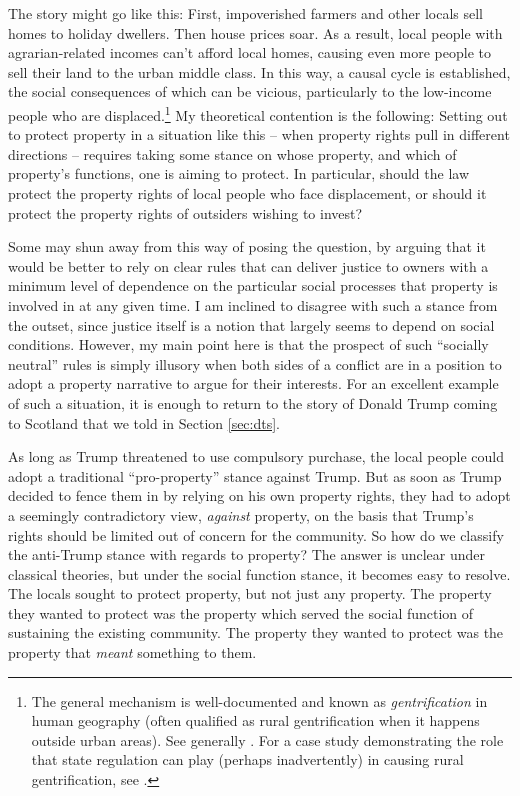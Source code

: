 \documentclass[12pt,a4paper]{book} %
\begin{document}
The story might go like this: First, impoverished farmers and other locals sell homes to holiday dwellers. Then house prices soar. As a result, local people with agrarian-related incomes can't afford local homes, causing even more people to sell their land to the urban middle class. In this way, a causal cycle is established, the social consequences of which can be vicious, particularly to the low-income people who are displaced.\footnote{The general mechanism is well-documented and known as {\it gentrification} in human geography (often qualified as rural gentrification when it happens outside urban areas). See generally \cite{weesep94,phillips93,slater06}. For a case study demonstrating the role that state regulation can play (perhaps inadvertently) in causing rural gentrification, see \cite[1027-1030]{darling05}.} My theoretical contention is the following: Setting out to protect property in a situation like this -- when property rights pull in different directions -- requires taking some stance on whose property, and which of property's functions, one is aiming to protect. In particular, should the law protect the property rights of local people who face displacement, or should it protect the property rights of outsiders wishing to invest?

Some may shun away from this way of posing the question, by arguing that it would be better to rely on clear rules that can deliver justice to owners with a minimum level of dependence on the particular social processes that property is involved in at any given time. I am inclined to disagree with such a stance from the outset, since justice itself is a notion that largely seems to depend on social conditions. However, my main point here is that the prospect of such ``socially neutral'' rules is simply illusory when both sides of a conflict are in a position to adopt a property narrative to argue for their interests. For an excellent example of such a situation, it is enough to return to the story of Donald Trump coming to Scotland that we told in Section \ref{sec:dts}.

As long as Trump threatened to use compulsory purchase, the local people could adopt a traditional ``pro-property'' stance against Trump. But as soon as Trump decided to fence them in by relying on his own property rights, they had to adopt a seemingly contradictory view, {\it against} property, on the basis that Trump's rights should be limited out of concern for the community. So how do we classify the anti-Trump stance with regards to property? The answer is unclear under classical theories, but under the social function stance, it becomes easy to resolve. The locals sought to protect property, but not just any property. The property they wanted to protect was the property which served the social function of sustaining the existing community. The property they wanted to protect was the property that {\it meant} something to them.
\end{document}
